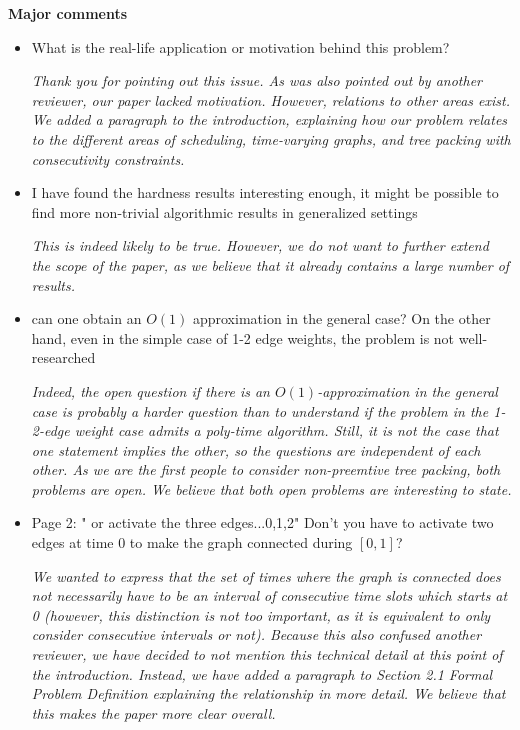 \documentclass[11pt,a4paper]{article}
\begin{document}
\textbf{Major comments}
\begin{itemize}

\item What is the real-life application or motivation behind this problem? 

\textit{Thank you for pointing out this issue. As was also pointed out by another reviewer, our paper lacked motivation. 
However, relations to other areas exist. 
We added a paragraph to the introduction, explaining how our problem relates to the different areas of scheduling, time-varying graphs, and tree packing with consecutivity constraints.}

\item I have found the hardness results interesting enough, it might be possible to find more non-trivial algorithmic results in generalized settings 

\textit{This is indeed likely to be true. However, we do not want to further extend the scope of the paper, as we believe that it already contains a large number of results.}

\item can one obtain an $O(1)$ approximation in the general case? On the other hand, even in the simple case of 1-2 edge weights, the problem is not well-researched

\textit{Indeed, the open question if there is an $O(1)$-approximation in the general case is probably a harder question than to understand if the problem in the 1-2-edge weight case admits a poly-time algorithm. Still, it is not the case that one statement implies the other, so the questions are independent of each other. As we are the first people to consider non-preemtive tree packing, both problems are open. We believe that both open problems are interesting to state.}


 
\item Page 2: " or activate the three edges...0,1,2" Don't you have to activate two edges at time 0 to make the graph connected during $[0,1]$?

\textit{We wanted to express that the set of times where the graph is connected does not necessarily have to be an interval of consecutive time slots which starts at 0 (however, this distinction is not too important, as it is equivalent to only consider consecutive intervals or not). Because this also confused another reviewer, we have decided to not mention this technical detail at this point of the introduction. Instead, we have added a paragraph to Section 2.1 Formal Problem Definition explaining the relationship in more detail. We believe that this makes the paper more clear overall.}


\end{itemize}
\end{document}
